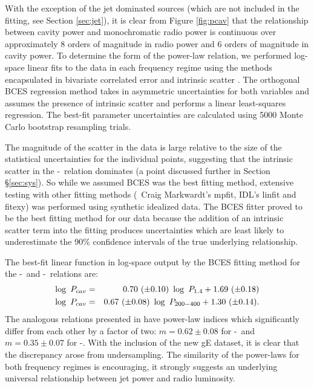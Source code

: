 \documentclass{emulateapj}
\begin{document}
With the exception of the jet dominated sources (which are not
included in the fitting, see Section \ref{sec:jet}), it is clear from
Figure \ref{fig:pcav} that the relationship between cavity power and
monochromatic radio power is continuous over approximately 8 orders of
magnitude in radio power and 6 orders of magnitude in cavity power. To
determine the form of the power-law relation, we performed log-space
linear fits to the data in each frequency regime using the methods
encapsulated in bivariate correlated error and intrinsic scatter
\citet[BCES][]{bces}. The orthogonal BCES regression method takes in
asymmetric uncertainties for both variables and assumes the presence
of intrinsic scatter and performs a linear least-squares
regression. The best-fit parameter uncertainties are calculated using
5000 Monte Carlo bootstrap resampling trials.

The magnitude of the scatter in the data is large relative to the size
of the statistical uncertainties for the individual points, suggesting
that the intrinsic scatter in the \pcav-\prad\ relation dominates (a
point discussed further in Section \S\ref{sec:sys}). So while we
assumed BCES was the best fitting method, extensive testing with other
fitting methods (\ie\ Craig Markwardt's mpfit, IDL's linfit and
fitexy) was performed using synthetic idealized data. The BCES fitter
proved to be the best fitting method for our data because the addition
of an intrinsic scatter term into the fitting produces uncertainties
which are least likely to underestimate the 90\% confidence intervals
of the true underlying relationship.

The best-fit linear function in log-space output by the
{\textsc{BCES}} fitting method for the \pcav-\phigh\ and
\pcav-\plow\ relations are:
\begin{eqnarray}
\log~P_{cav} &=& 0.70~(\pm 0.10)~\log~P_{\mathrm{1.4}} + 1.69~(\pm 0.18)\\
\log~P_{cav} &=& 0.67~(\pm 0.08)~\log~P_{\mathrm{200-400}} + 1.30~(\pm 0.14).
\end{eqnarray}
The analogous relations presented in \citet{birzan08} have power-law
indices which significantly differ from each other by a factor of two:
$m = 0.62 \pm 0.08$ for \pcav-\pthree\ and $m = 0.35 \pm 0.07$ for
\pcav-\phigh. With the inclusion of the new gE dataset, it is clear
that the discrepancy arose from undersampling. The similarity of the
power-laws for both frequency regimes is encouraging, it strongly
suggests an underlying universal relationship between jet power and
radio luminosity.
\end{document}
